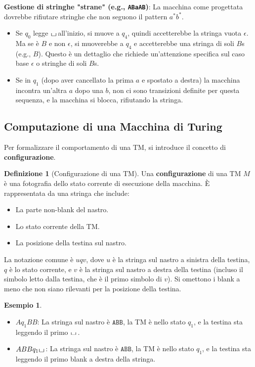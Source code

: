 \documentclass[a4paper]{article}
\theoremstyle{definition} %
\newtheorem{definition}{Definizione}
\newtheorem{example}{Esempio}
\newcommand{\blankS}{\ensuremath{\raisebox{-0.15ex}{\scalebox{1.3}[0.7]{$\sqcup$}}\mkern2mu}}
\begin{document}
\textbf{Gestione di stringhe "strane" (e.g., \texttt{ABaAB})}:
La macchina come progettata dovrebbe rifiutare stringhe che non seguono il pattern $a^*b^*$.
\begin{itemize}
    \item Se $q_0$ legge \blankS all'inizio, si muove a $q_4$, quindi accetterebbe la stringa vuota $\epsilon$. Ma se è $B$ e non $\epsilon$, si muoverebbe a $q_4$ e accetterebbe una stringa di soli $B$s (e.g., $B$). Questo è un dettaglio che richiede un'attenzione specifica sul caso base $\epsilon$ o stringhe di soli $B$s.
    \item Se in $q_1$ (dopo aver cancellato la prima $a$ e spostato a destra) la macchina incontra un'altra $a$ dopo una $b$, non ci sono transizioni definite per questa sequenza, e la macchina si blocca, rifiutando la stringa.
\end{itemize}

\subsection{Computazione di una Macchina di Turing}
Per formalizzare il comportamento di una TM, si introduce il concetto di \textbf{configurazione}.

\begin{definition}[Configurazione di una TM]
    Una \textbf{configurazione} di una TM $M$ è una fotografia dello stato corrente di esecuzione della macchina. È rappresentata da una stringa che include:
    \begin{itemize}
        \item La parte non-blank del nastro.
        \item Lo stato corrente della TM.
        \item La posizione della testina sul nastro.
    \end{itemize}
    La notazione comune è $uqv$, dove $u$ è la stringa sul nastro a sinistra della testina, $q$ è lo stato corrente, e $v$ è la stringa sul nastro a destra della testina (incluso il simbolo letto dalla testina, che è il primo simbolo di $v$). Si omettono i blank a meno che non siano rilevanti per la posizione della testina.
    \begin{example}
        \begin{itemize}
            \item $A q_1 BB$: La stringa sul nastro è $\texttt{ABB}$, la TM è nello stato $q_1$, e la testina sta leggendo il primo $\blankS$.
            \item $ABB q_1 \blankS$: La stringa sul nastro è $\texttt{ABB}$, la TM è nello stato $q_1$, e la testina sta leggendo il primo blank a destra della stringa.
        \end{itemize}
    \end{example}
\end{definition}
\end{document}
